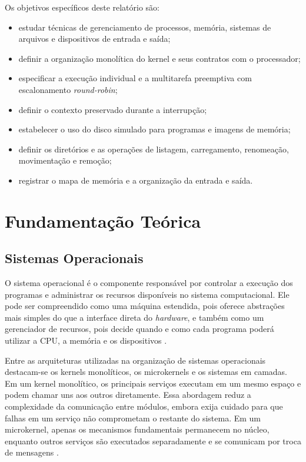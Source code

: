 \documentclass[
    12pt,
    openright,
    a4paper,
    english,
    brazilian
]{abntex2}
\begin{document}
Os objetivos específicos deste relatório são:

\begin{itemize}
    \item estudar técnicas de gerenciamento de processos, memória, sistemas de arquivos e dispositivos de entrada e saída;
    \item definir a organização monolítica do kernel e seus contratos com o processador;
    \item especificar a execução individual e a multitarefa preemptiva com escalonamento \emph{round-robin};
    \item definir o contexto preservado durante a interrupção;
    \item estabelecer o uso do disco simulado para programas e imagens de memória;
    \item definir os diretórios e as operações de listagem, carregamento, renomeação, movimentação e remoção;
    \item registrar o mapa de memória e a organização da entrada e saída.
\end{itemize}

\chapter{Fundamentação Teórica}

\section{Sistemas Operacionais}

O sistema operacional é o componente responsável por controlar a execução dos programas e administrar os recursos disponíveis no sistema computacional. Ele pode ser compreendido como uma máquina estendida, pois oferece abstrações mais simples do que a interface direta do \emph{hardware}, e também como um gerenciador de recursos, pois decide quando e como cada programa poderá utilizar a CPU, a memória e os dispositivos \cite{tanenbaum2016}.

Entre as arquiteturas utilizadas na organização de sistemas operacionais destacam-se os kernels monolíticos, os microkernels e os sistemas em camadas. Em um kernel monolítico, os principais serviços executam em um mesmo espaço e podem chamar uns aos outros diretamente. Essa abordagem reduz a complexidade da comunicação entre módulos, embora exija cuidado para que falhas em um serviço não comprometam o restante do sistema. Em um microkernel, apenas os mecanismos fundamentais permanecem no núcleo, enquanto outros serviços são executados separadamente e se comunicam por troca de mensagens \cite{silberschatz2015}.
\end{document}
